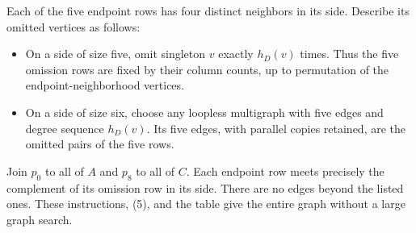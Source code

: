 \documentclass[11pt]{article}
\begin{document}
Each of the five endpoint rows has four distinct neighbors in its
side. Describe its omitted vertices as follows:
\begin{itemize}
\item On a side of size five, omit singleton $v$ exactly $h_D(v)$
times. Thus the five omission rows are fixed by their column counts,
up to permutation of the endpoint-neighborhood vertices.
\item On a side of size six, choose any loopless multigraph with
five edges and degree sequence $h_D(v)$. Its five edges, with
parallel copies retained, are the omitted pairs of the five rows.
\end{itemize}
Join $p_0$ to all of $A$ and $p_8$ to all of $C$. Each endpoint row
meets precisely the complement of its omission row in its side.
There are no edges beyond the listed ones. These instructions,
(5), and the table give the entire graph without a large graph search.
\end{document}
